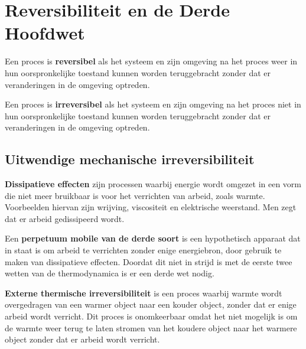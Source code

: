 \section{Reversibiliteit en de Derde Hoofdwet}

\begin{definition}
    Een proces is \textbf{reversibel} als het systeem en zijn omgeving na het proces weer in hun oorspronkelijke toestand kunnen worden teruggebracht zonder dat er veranderingen in de omgeving optreden.
\end{definition}
\begin{definition}
    Een proces is \textbf{irreversibel} als het systeem en zijn omgeving na het proces niet in hun oorspronkelijke toestand kunnen worden teruggebracht zonder dat er veranderingen in de omgeving optreden.
\end{definition}

\subsection{Uitwendige mechanische irreversibiliteit}
\begin{definition}
    \textbf{Dissipatieve effecten} zijn processen waarbij energie wordt omgezet in een vorm die niet meer bruikbaar is voor het verrichten van arbeid, zoals warmte.
    Voorbeelden hiervan zijn wrijving, viscositeit en elektrische weerstand. Men zegt dat er arbeid gedissipeerd wordt.
\end{definition}

\begin{definition}   
    Een \textbf{perpetuum mobile van de derde soort} is een hypothetisch apparaat dat in staat is om arbeid te verrichten zonder enige energiebron, door gebruik te maken van dissipatieve effecten. 
    Doordat dit niet in strijd is met de eerste twee wetten van de thermodynamica is er een derde wet nodig.
\end{definition}

\begin{definition}
    \textbf{Externe thermische irreversibiliteit} is een proces waarbij warmte wordt overgedragen van een warmer object naar een kouder object, zonder dat er enige arbeid wordt verricht. 
    Dit proces is onomkeerbaar omdat het niet mogelijk is om de warmte weer terug te laten stromen van het koudere object naar het warmere object zonder dat er arbeid wordt verricht.
\end{definition}

